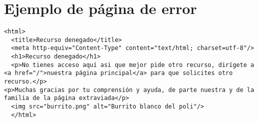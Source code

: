 \renewcommand{\appendixname}{Anexos}
\renewcommand{\appendixtocname}{Anexos}
\renewcommand{\appendixpagename}{Anexos}
\pagebreak

\pagestyle{empty}
\pagestyle{plain}

\appendix
\addappheadtotoc
\appendixpage


\section{Ejemplo de página de error}


\begin{lstlisting}[breaklines,frame=single,style=HTMLStyle]
 <html>
  <title>Recurso denegado</title>
  <meta http-equiv="Content-Type" content="text/html; charset=utf-8"/>
  <h1>Recurso denegado</h1>
  <p>No tienes acceso aquí asi que mejor pide otro recurso, dirígete a <a href="/">nuestra página principal</a> para que solicites otro recurso.</p> 
<p>Muchas gracias por tu comprensión y ayuda, de parte nuestra y de la familia de la página extraviada</p>
  <img src="burrito.png" alt="Burrito blanco del poli"/>
  </html>
\end{lstlisting}   
